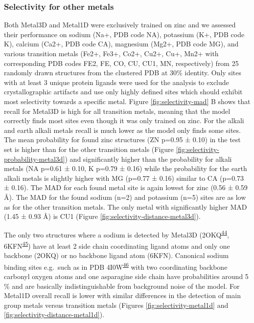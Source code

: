 \documentclass[  ASAPversion,
  ,
  9pt]{elife}
\begin{document}
\hypertarget{selectivity-for-other-metals}{%
\subsubsection{Selectivity for other metals}\label{selectivity-for-other-metals}}

Both Metal3D and Metal1D were exclusively trained on zinc and we assessed their performance on sodium (Na+, PDB code NA), potassium (K+, PDB code K), calcium (Ca2+, PDB code CA), magnesium (Mg2+, PDB code MG), and various transition metals (Fe2+, Fe3+, Co2+, Cu2+, Cu+, Mn2+ with corresponding PDB codes FE2, FE, CO, CU, CU1, MN, respectively) from 25 randomly drawn structures from the clustered PDB at 30\% identity. Only sites with at least 3 unique protein ligands were used for the analysis to exclude crystallographic artifacts and use only highly defined sites which should exhibit most selectivity towards a specific metal. Figure \ref{fig:selectivity-mad} B shows that recall for Metal3D is high for all transition metals, meaning that the model correctly finds most sites even though it was only trained on zinc. For the alkali and earth alkali metals recall is much lower as the model only finds some sites. The mean probability for found zinc structures (ZN p=0.95 ± 0.10) in the test set is higher than for the other transition metals (Figure \ref{fig:selectivity-probability-metal3d}) and significantly higher than the probability for alkali metals (NA p=0.61 ± 0.10, K p=0.79 ± 0.16) while the probability for the earth alkali metals is slightly higher with MG (p=0.77 ± 0.16) similar to CA (p=0.73 ± 0.16). The MAD for each found metal site is again lowest for zinc (0.56 ± 0.59 \AA ). The MAD for the found sodium (n=2) and potassium (n=5) sites are as low as for the other transition metals. The only metal with significantly higher MAD (1.45 ± 0.93 \AA ) is CU1 (Figure \ref{fig:selectivity-distance-metal3d}).

The only two structures where a sodium is detected by Metal3D (2OKQ\textsuperscript{\protect\hyperlink{ref-Qubi5dZD}{44}}, 6KFN\textsuperscript{\protect\hyperlink{ref-g7lHXZp5}{45}}) have at least 2 side chain coordinating ligand atoms and only one backbone (2OKQ) or no backbone ligand atom (6KFN). Canonical sodium binding sites e.g.~such as in PDB 4I0W\textsuperscript{\protect\hyperlink{ref-w9ECLZDp}{46}} with two coordinating backbone carbonyl oxygen atoms and one asparagine side chain have probabilities around 5 \% and are basically indistinguishable from background noise of the model.
For Metal1D overall recall is lower with similar differences in the detection of main group metals versus transition metals (Figures \ref{fig:selectivity-metal1d} and \ref{fig:selectivity-distance-metal1d}).
\end{document}
